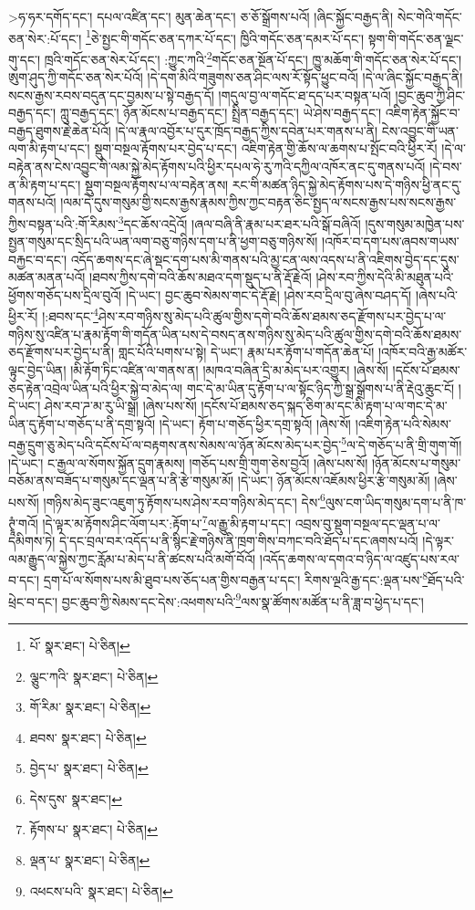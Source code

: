  >ཧ་ཧར་དགོད་དང་། དཔལ་འཛིན་དང་། མུན་ཆེན་དང་། ཅ་ཅོ་སྒྲོགས་པའོ། །ཞིང་སྐྱོང་བརྒྱད་ནི། སེང་གེའི་གདོང་ཅན་སེར་:པོ་དང་། \footnote{པོ་  སྣར་ཐང་།  པེ་ཅིན། }ཅེ་སྤྱང་གི་གདོང་ཅན་དཀར་པོ་དང་། ཁྱིའི་གདོང་ཅན་དམར་པོ་དང་། སྟག་གི་གདོང་ཅན་ལྗང་གུ་དང་། ཁྲའི་གདོང་ཅན་སེར་པོ་དང་། :ཀྱུང་ཀའི་\footnote{ལྕུང་ཀའི་  སྣར་ཐང་།  པེ་ཅིན། }གདོང་ཅན་སྔོན་པོ་དང་། ཁྱུ་མཆོག་གི་གདོང་ཅན་སེར་པོ་དང་། ཨུག་ཤུད་ཀྱི་གདོང་ཅན་སེར་པོའོ། །དེ་དག་མིའི་གཟུགས་ཅན་ཤིང་ལས་རོ་སྟོད་ཕྱུང་བའོ། །དེ་ལ་ཞིང་སྐྱོང་བརྒྱད་ནི། སངས་རྒྱས་རབས་བདུན་དང་བྱམས་པ་སྟེ་བརྒྱད་དོ། །གདུལ་བྱ་ལ་གདོང་ཐ་དད་པར་བསྟན་པའོ། །བྱང་ཆུབ་ཀྱི་ཤིང་བརྒྱད་དང་། ཀླུ་བརྒྱད་དང་། ཉོན་མོངས་པ་བརྒྱད་དང་། སྤྲིན་བརྒྱད་དང་། ཡེ་ཤེས་བརྒྱད་དང་། འཇིག་རྟེན་སྐྱོང་བ་བརྒྱད་ཐུགས་རྗེ་ཆེན་པོའོ། །དེ་ལ་རྣལ་འབྱོར་པ་དུར་ཁྲོད་བརྒྱད་ཀྱིས་དབེན་པར་གནས་པ་ནི། ངེས་འབྱུང་གི་ཡན་ལག་མི་རྟག་པ་དང་། སྡུག་བསྔལ་རྟོགས་པར་བྱེད་པ་དང་། འཇིག་རྟེན་གྱི་ཆོས་ལ་ཆགས་པ་སྤོང་བའི་ཕྱིར་རོ། །དེ་ལ་བརྟེན་ནས་ངེས་འབྱུང་གི་ལམ་སྐྱེ་མེད་རྟོགས་པའི་ཕྱིར་དཔལ་ཧེ་རུ་ཀའི་དཀྱིལ་འཁོར་ནང་དུ་གནས་པའོ། །དེ་བས་ན་མི་རྟག་པ་དང་། སྡུག་བསྔལ་རྟོགས་པ་ལ་བརྟེན་ནས། རང་གི་མཚན་ཉིད་སྐྱེ་མེད་རྟོགས་པས་དེ་གཉིས་ཕྱི་ནང་དུ་གནས་པའོ། །ལམ་དེ་དུས་གསུམ་གྱི་སངས་རྒྱས་རྣམས་ཀྱིས་ཀྱང་བརྟན་ཅིང་སྤྱད་ལ་སངས་རྒྱས་པས་སངས་རྒྱས་ཀྱིས་བསྟན་པའི་:གོ་རིམས་\footnote{གོ་རིམ་  སྣར་ཐང་།  པེ་ཅིན། }དང་ཆོས་འདྲེའོ། །ཞལ་བཞི་ནི་རྣམ་པར་ཐར་པའི་སྒོ་བཞིའོ། །དུས་གསུམ་མཁྱེན་པས་སྤྱན་གསུམ་དང་སྲིད་པའི་ཡན་ལག་བཅུ་གཉིས་དག་པ་ནི་ཕྱག་བཅུ་གཉིས་སོ། །འཁོར་བ་དག་པས་ཞབས་གཡས་བརྐྱང་བ་དང་། འདོད་ཆགས་དང་ཞེ་སྡང་དག་པས་མི་གནས་པའི་མྱ་ངན་ལས་འདས་པ་ནི་འཇིགས་བྱེད་དང་དུས་མཚན་མནན་པའོ། །ཐབས་ཀྱིས་དགེ་བའི་ཆོས་མཐའ་དག་སྡུད་པ་ནི་རྡོ་རྗེའོ། །ཤེས་རབ་ཀྱིས་དེའི་མི་མཐུན་པའི་ཕྱོགས་གཅོད་པས་དྲིལ་བུའོ། །དེ་ཡང་། བྱང་ཆུབ་སེམས་གང་དེ་རྡོ་རྗེ། །ཤེས་རབ་དྲིལ་བུ་ཞེས་བཤད་དོ། །ཞེས་པའི་ཕྱིར་རོ། །:ཐབས་དང་\footnote{ཐབས་  སྣར་ཐང་།  པེ་ཅིན། }ཤེས་རབ་གཉིས་སུ་མེད་པའི་ཚུལ་གྱིས་དགེ་བའི་ཆོས་ཐམས་ཅད་རྫོགས་པར་བྱེད་པ་ལ་གཉིས་སུ་འཛིན་པ་རྣམ་རྟོག་གི་གདོན་ཡིན་པས་དེ་བསད་ནས་གཉིས་སུ་མེད་པའི་ཚུལ་གྱིས་དགེ་བའི་ཆོས་ཐམས་ཅད་རྫོགས་པར་བྱེད་པ་ནི། གླང་པོའི་པགས་པ་སྟེ། དེ་ཡང་། རྣམ་པར་རྟོག་པ་གདོན་ཆེན་པོ། །འཁོར་བའི་རྒྱ་མཚོར་ལྟུང་བྱེད་ཡིན། །མི་རྟོག་ཏིང་འཛིན་ལ་གནས་ན། །མཁའ་བཞིན་དྲི་མ་མེད་པར་འགྱུར། །ཞེས་སོ། །དངོས་པོ་ཐམས་ཅད་རྟེན་འབྲེལ་ཡིན་པའི་ཕྱིར་སྐྱེ་བ་མེད་ལ། གང་དེ་མ་ཡིན་དུ་རྟོག་པ་ལ་སྟོང་ཉིད་ཀྱི་སྒྲ་སྒྲོགས་པ་ནི་རྡེའུ་ཆུང་ངོ། །དེ་ཡང་། ཤེས་རབ་ཌ་མ་རུ་ཡི་སྒྲ། །ཞེས་པས་སོ། །དངོས་པོ་ཐམས་ཅད་སྐད་ཅིག་མ་དང་མི་རྟག་པ་ལ་གང་དེ་མ་ཡིན་དུ་རྟོག་པ་གཅོད་པ་ནི་དགྲ་སྟའོ། །དེ་ཡང་། རྟོག་པ་གཅོད་ཕྱིར་དགྲ་སྟའོ། །ཞེས་སོ། །འཇིག་རྟེན་པའི་སེམས་བརྒྱ་དྲུག་ཅུ་མེད་པའི་དངོས་པོ་ལ་བརྟགས་ནས་སེམས་ལ་ཉོན་མོངས་མེད་པར་བྱེད་\footnote{བྱེད་པ་  སྣར་ཐང་།  པེ་ཅིན། }ལ་དེ་གཅོད་པ་ནི་གྲི་གུག་གོ། །དེ་ཡང་། ང་རྒྱལ་ལ་སོགས་སྐྱོན་དྲུག་རྣམས། །གཅོད་པས་གྲི་གུག་ཅེས་བྱའོ། །ཞེས་པས་སོ། །ཉོན་མོངས་པ་གསུམ་བཅོམ་ནས་བཟོད་པ་གསུམ་དང་ལྡན་པ་ནི་རྩེ་གསུམ་མོ། །དེ་ཡང་། ཉོན་མོངས་འཇོམས་ཕྱིར་རྩེ་གསུམ་མོ། །ཞེས་པས་སོ། །གཉིས་མེད་ཟུང་འཇུག་ཏུ་རྟོགས་པས་ཤེས་རབ་གཉིས་མེད་དང་། དེས་\footnote{དེས་དུས་  སྣར་ཐང་། }ལུས་ངག་ཡིད་གསུམ་དག་པ་ནི་ཁ་ཊྭཱཾ་གའོ། །དེ་ལྟར་མ་རྟོགས་ཤིང་ལོག་པར་:རྟོག་པ་\footnote{རྟོགས་པ་  སྣར་ཐང་།  པེ་ཅིན། }ལ་རྒྱུ་མི་རྟག་པ་དང་། འབྲས་བུ་སྡུག་བསྔལ་དང་ལྡན་པ་ལ་དམིགས་ཏེ། དེ་དང་བྲལ་བར་འདོད་པ་ནི་སྙིང་རྗེ་གཉིས་ནི་ཁྲག་གིས་བཀང་བའི་ཐོད་པ་དང་ཞགས་པའོ། །དེ་ལྟར་ལམ་རྒྱུད་ལ་སྐྱེས་ཀྱང་རློམ་པ་མེད་པ་ནི་ཚངས་པའི་མགོ་བོའོ། །འདོད་ཆགས་ལ་དགའ་བ་ཉིད་ལ་འཛུད་པས་རལ་བ་དང་། དྲག་པོ་ལ་སོགས་པས་མི་ཐུབ་པས་ཅོད་པན་གྱིས་བརྒྱན་པ་དང་། རིགས་ལྔའི་རྒྱ་དང་:ལྡན་པས་\footnote{ལྡན་པ་  སྣར་ཐང་།  པེ་ཅིན། }ཐོད་པའི་ཕྲེང་བ་དང་། བྱང་ཆུབ་ཀྱི་སེམས་དང་དེས་:འཕགས་པའི་\footnote{འཕངས་པའི་  སྣར་ཐང་།  པེ་ཅིན། }ལས་སྣ་ཚོགས་མཚོན་པ་ནི་ཟླ་བ་ཕྱེད་པ་དང་། 